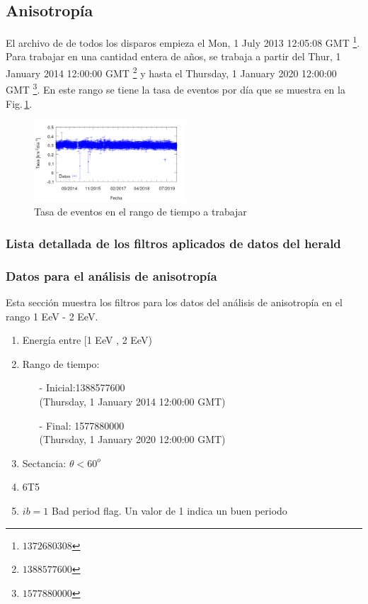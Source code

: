 \subsection{Anisotropía}
El archivo de de todos los disparos empieza el Mon, 1 July 2013 12:05:08 GMT \footnote{$1372680308$}. Para trabajar en una cantidad entera de años, se trabaja a partir del  Thur, 1 January 2014 12:00:00 GMT \footnote{$1388577600$} y hasta el Thursday, 1 January 2020 12:00:00 GMT \footnote{$1577880000$}.  En este rango se tiene la tasa de eventos por día que se muestra en la Fig.\,\ref{tasa_total_diaria}.


\begin{figure}[H]
	\centering
	\includegraphics[width=0.5\textwidth]{rate_total.png}
	\caption{Tasa  de eventos en el rango de tiempo a trabajar}
	\label{tasa_total_diaria}
\end{figure}

\subsubsection{Lista detallada de los filtros aplicados de datos del herald}

\subsubsection{Datos para el análisis de anisotropía}
Esta sección muestra los filtros para los datos del análisis de anisotropía en el rango 1 EeV - 2 EeV.

\begin{enumerate}
	\item Energía entre  [1 EeV , 2 EeV)
	\item Rango de tiempo:
	\begin{itemize}
		\item[-] Inicial:1388577600 \\ (Thursday, 1 January 2014 12:00:00 GMT)
		\item[-] Final: 1577880000  \\ (Thursday, 1 January 2020 12:00:00 GMT)
	\end{itemize}
	\item Sectancia:  $\theta < 60^o$
	\item 6T5
	\item $ib=1$ Bad period flag. Un valor de 1 indica un buen periodo
\end{enumerate}

